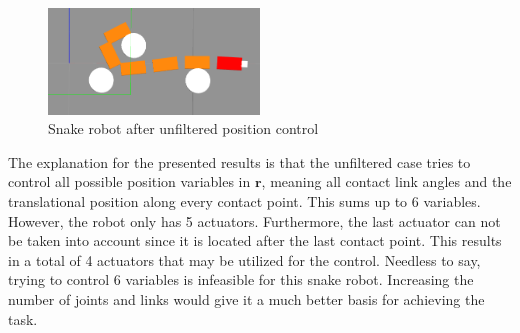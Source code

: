 \begin{figure}
    \centering
    \includegraphics[width=0.5\textwidth]{figures/experiments/single_pos/gazebo_single_pos_nofilter.png}
    \caption{Snake robot after unfiltered position control}
    \label{fig:singlepos-gazebo-nofilter}
\end{figure}

The explanation for the presented results is that the unfiltered case tries to control all possible position variables in $\mathbf{r}$, meaning all contact link angles and the translational position along every contact point. This sums up to 6 variables. However, the robot only has 5 actuators. Furthermore, the last actuator can not be taken into account since it is located after the last contact point. This results in a total of 4 actuators that may be utilized for the control. 
Needless to say, trying to control 6 variables is infeasible for this snake robot. Increasing the number of joints and links would give it a much better basis for achieving the task.







